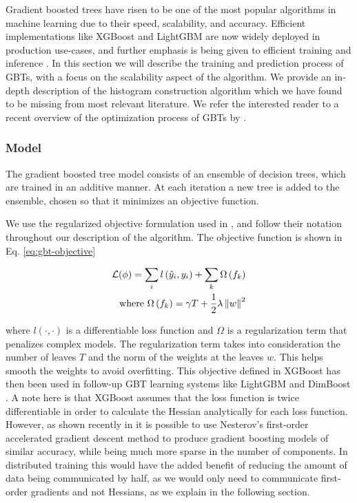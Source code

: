 Gradient boosted trees have risen to be one of the most popular algorithms
in machine learning due to their speed, scalability, and accuracy. Efficient
implementations like XGBoost \cite{xgboost} and LightGBM \cite{lightgbm}
are now widely deployed in production use-cases, and further emphasis
is being given to efficient training \cite{dimboost} and inference \cite{quickscorer, tree-cache-conscious, tree-runtime-opt}.
In this section we will describe the training and prediction process of GBTs,
with a focus on the scalability aspect of the algorithm. We provide an in-depth
description of the histogram construction algorithm which we have found to be missing
from most relevant literature. We refer the interested reader to a recent overview
of the optimization process of GBTs by \citet{biau-optimization}.

\subsubsection*{Model}

The gradient boosted tree model consists of an ensemble of decision trees,
which are trained in an additive manner. At each iteration a new tree is added
to the ensemble, chosen so that it minimizes an objective function.

We use the
regularized objective formulation used
in \cite{xgboost}, and follow their notation throughout our description of the algorithm.
The objective function is shown in Eq. \ref{eq:gbt-objective}

\begin{equation}
	\begin{split}
	\mathcal{L}(\phi) = \sum_{i} l\left(\hat{y}_{i},y_{i}\right) + \sum_{k} \Omega\left(f_{k}\right) \\
	\text{where } \Omega\left(f_{k}\right) = \gamma T + \frac{1}{2} \lambda \left\lVert w\right\rVert^2
	\end{split}
	\label{eq:gbt-objective}
\end{equation}

\noindent
where $l(\cdot, \cdot)$ is a differentiable loss function and $\Omega$ is a regularization term
that penalizes complex models. The regularization term takes into consideration
the number of leaves $T$ and the norm of the weights at the leaves $w$. This helps
smooth the weights to avoid overfitting. This objective defined in XGBoost
has then been used in follow-up GBT learning systems like LightGBM and
DimBoost \cite{lightgbm, dimboost}.  A note here is that XGBoost
assumes that the loss function is twice differentiable in order
to calculate the Hessian analytically for each loss function.
However, as shown recently in \cite{accelerated-gb} it is possible
to use Nesterov's first-order accelerated gradient descent method
\cite{nesterov-book} to produce gradient boosting models of similar
accuracy, while being much more sparse in the number of components.
In distributed training this would have the added benefit of reducing
the amount of data being communicated by half, as we would only need to
communicate first-order gradients and not Hessians, as we explain
in the following section.



